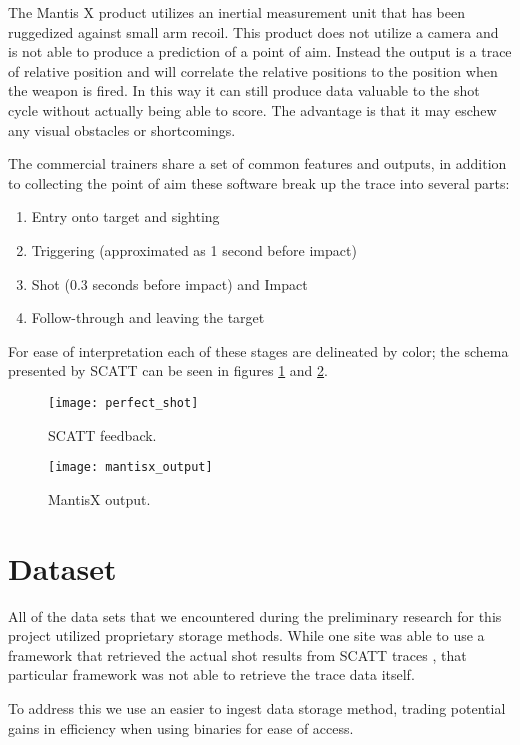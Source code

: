 \documentclass[conference]{IEEEtran}
\begin{document}
The Mantis X product utilizes an inertial measurement unit that has been ruggedized against small arm recoil. 
This product does not utilize a camera and is not able to produce a prediction of a point of aim.
Instead the output is a trace of relative position and will correlate the relative positions to the position when the weapon is fired.
In this way it can still produce data valuable to the shot cycle without actually being able to score.
The advantage is that it may eschew any visual obstacles or shortcomings.

The commercial trainers share a set of common features and outputs,
in addition to collecting the point of aim these software break up the trace into several parts:
\begin{enumerate}
	\item Entry onto target and sighting
	\item Triggering (approximated as 1 second before impact)
	\item Shot (0.3 seconds before impact)  and Impact
	\item Follow-through and leaving the target
\end{enumerate}
For ease of interpretation each of these stages are delineated by color; the schema presented by SCATT can be seen in figures 
\ref{fig:SCATT_Example} and
\ref{fig:MantisX_Example}.

\begin{figure}[h]
	\centering
	\texttt{[image: perfect\_shot]}
	\caption{SCATT \cite{scatt} feedback.}
	\label{fig:SCATT_Example}
\end{figure}

\begin{figure}[h]
	\centering
	\texttt{[image: mantisx\_output]}
	\caption{MantisX output.}
	\label{fig:MantisX_Example}
\end{figure}

\section{Dataset}

All of the data sets that we encountered during the preliminary research for this project utilized proprietary storage methods.
While one site was able to use a framework that retrieved the actual shot results from SCATT traces \cite{scatt-db}, that particular framework was not able to retrieve the trace data itself.

To address this we use an easier to ingest data storage method, trading potential gains in efficiency when using binaries for ease of access.
\end{document}
